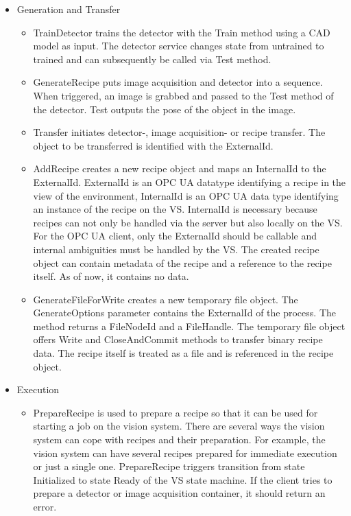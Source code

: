 \begin{itemize}
    \item Generation and Transfer
    \begin{itemize}
        \item TrainDetector trains the detector with the Train method using a CAD model as input. The detector service changes state from untrained to trained and can subsequently be called via Test method.
        \item GenerateRecipe puts image acquisition and detector into a sequence. When triggered, an image is grabbed and passed to the Test method of the detector. Test outputs the pose of the object in the image.
        \item Transfer initiates detector-, image acquisition- or recipe transfer. The object to be transferred is identified with the ExternalId.
        \item AddRecipe creates a new recipe object and maps an InternalId to the ExternalId. ExternalId is an OPC UA datatype identifying a recipe in the view of the environment, InternalId is an OPC UA data type identifying an instance of the recipe on the VS.  InternalId is necessary because recipes can not only be handled via the server but also locally on the VS. For the OPC UA client, only the ExternalId should be callable and internal ambiguities must be handled by the VS. The created recipe object can contain metadata of the recipe and a reference to the recipe itself. As of now, it contains no data.
    	\item GenerateFileForWrite creates a new temporary file object. The GenerateOptions parameter contains the ExternalId of the process. The method returns a FileNodeId and a FileHandle. The temporary file object offers Write and CloseAndCommit methods to transfer binary recipe data. The recipe itself is treated as a file and is referenced in the recipe object.
    \end{itemize}
    \item Execution
    \begin{itemize}
    	\item PrepareRecipe is used to prepare a recipe so that it can be used for starting a job on the vision system. There are several ways the vision system can cope with recipes and their preparation. For example, the vision system can have several recipes prepared for immediate execution or just a single one. PrepareRecipe triggers transition from state Initialized to state Ready of the VS state machine. If the client tries to prepare a detector or image acquisition container, it should return an error.

\end{itemize}
\end{itemize}

